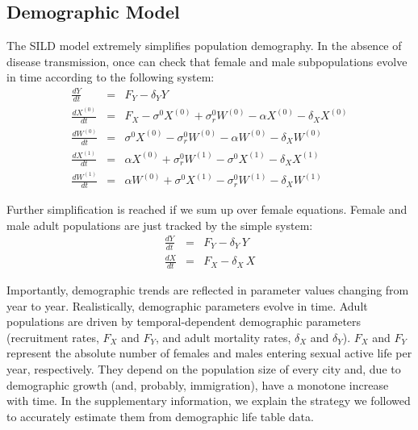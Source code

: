 \documentclass[preprint,12pt]{elsarticle}
\begin{document}
\subsection{Demographic Model}
The SILD model extremely simplifies population demography. In the absence of disease transmission, once can check that female and male subpopulations evolve in time according to the following system:
\begin{eqnarray}
\frac{dY}{dt} & = & F_Y - \delta_Y Y \nonumber\\
\frac{dX^{(0)}}{dt} & = & F_X -\sigma^0 X^{(0)} +\sigma_r^0 W^{(0)} -\alpha X^{(0)} -\delta_X X^{(0)} \nonumber\\
\frac{dW^{(0)}}{dt} & = & \sigma^0 X^{(0)} -\sigma_r^0 W^{(0)} -\alpha W^{(0)} -\delta_X W^{(0)} \nonumber \\
\frac{dX^{(1)}}{dt} & = & \alpha X^{(0)} + \sigma_r^0 W^{(1)} -\sigma^0 X^{(1)} -\delta_X X^{(1)} \nonumber\\
\frac{dW^{(1)}}{dt} & = & \alpha W^{(0)} + \sigma^0 X^{(1)}  -\sigma_r^0 W^{(1)} -\delta_X W^{(1)}
\label{Eq:Demography_0}
\end{eqnarray}

Further simplification is reached if we sum up over female equations. Female and male adult populations are just tracked by the simple system:
\begin{eqnarray}
\frac{dY}{dt} & = & F_Y - \delta_Y \, Y\nonumber\\
\frac{dX}{dt} & = & F_X - \delta_X \, X
\label{Eq:Demography_S}
\end{eqnarray}

Importantly, demographic trends are reflected in parameter values changing from year to year. Realistically, demographic parameters evolve in time. Adult populations are driven by temporal-dependent demographic parameters (recruitment rates, $F_X$ and $F_Y$, and adult mortality rates, $\delta_X$ and $\delta_Y$). $F_X$ and $F_Y$ represent the absolute number of females and males entering sexual active life per year, respectively. They depend on the population size of every city and,  due to demographic growth (and, probably, immigration), have a monotone increase with time. In the supplementary information, we explain the strategy we followed to accurately estimate them from demographic life table data. 
\smallskip
\end{document}
